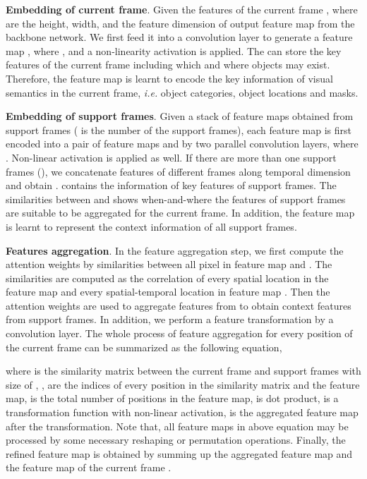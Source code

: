 \documentclass[letterpaper]{article} \usepackage{aaai21}  \usepackage{times}  \usepackage{helvet} \usepackage{courier}  \usepackage[hyphens]{url}  \usepackage{graphicx} \urlstyle{rm} \def\UrlFont{\rm}  \usepackage{natbib}  \usepackage{caption} \frenchspacing  \setlength{\pdfpagewidth}{8.5in}  \setlength{\pdfpageheight}{11in}  \newcommand{\etal}{\emph{et al. }}
\newcommand{\ie}{\emph{i.e. }}
\begin{document}
{\bf Embedding of current frame}. Given the features of the current frame , where  are the height, width, and the feature dimension of output feature map from the backbone network. We first feed it into a convolution layer to generate a feature map , where , and a non-linearity activation is applied. The  can store the key features of the current frame including which and where objects may exist. Therefore, the feature map  is learnt to encode the key information of visual semantics in the current frame, \ie object categories, object locations and masks.

{\bf Embedding of support frames}. Given a stack of feature maps obtained from support frames  ( is the number of the support frames), each feature map  is first encoded into a pair of feature maps  and  by two parallel convolution layers, where .  Non-linear activation is applied as well. If there are more than one support frames (), we concatenate features of different frames along temporal dimension and obtain .  contains the information of key features of support frames. The similarities between  and  shows when-and-where the features of support frames are suitable to be aggregated for the current frame. In addition, the feature map  is learnt to represent the context information of all support frames.

{\bf Features aggregation}. In the feature aggregation step, we first compute the attention weights by similarities between all pixel in feature map  and . The similarities are computed as the correlation of every spatial location in the feature map  and every spatial-temporal location in feature map . Then the attention weights are used to aggregate features from  to obtain context features from support frames. In addition, we perform a feature transformation by a  convolution layer. The whole process of feature aggregation for every position of the current frame can be summarized as the following equation,

where  is the similarity matrix between the current frame and support frames with size of , ,  are the indices of every position in the similarity matrix and the feature map,  is the total number of positions in the feature map,  is dot product,  is a transformation function with non-linear activation,  is the aggregated feature map after the transformation. Note that, all feature maps in above equation may be processed by some necessary reshaping or permutation operations. Finally, the refined feature map  is obtained by summing up the aggregated feature map  and the feature map of the current frame .
 
\end{document}
